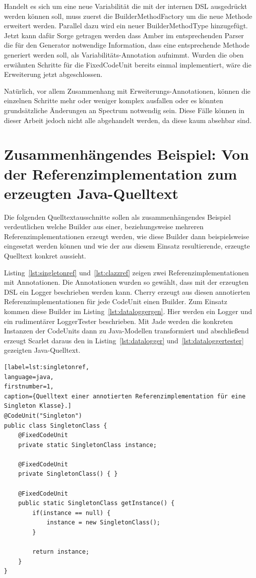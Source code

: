 \documentclass[12pt,oneside,a4paper,parskip]{scrbook}
\begin{document}
Handelt es sich um eine neue Variabilität die mit der internen DSL ausgedrückt werden können soll, muss zuerst die BuilderMethodFactory um die neue Methode erweitert werden. Parallel dazu wird ein neuer BuilderMethodType hinzugefügt. Jetzt kann dafür Sorge getragen werden dass Amber im entsprechenden Parser die für den Generator notwendige Information, dass eine entsprechende Methode generiert werden soll, als Variabilitäts-Annotation aufnimmt. Wurden die oben erwähnten Schritte für die FixedCodeUnit bereits einmal implementiert, wäre die Erweiterung jetzt abgeschlossen.

Natürlich, vor allem Zusammenhang mit Erweiterungs-Annotationen, können die einzelnen Schritte mehr oder weniger komplex ausfallen oder es könnten grundsätzliche Änderungen an Spectrum notwendig sein. Diese Fälle können in dieser Arbeit jedoch nicht alle abgehandelt werden, da diese kaum absehbar sind.

\section{Zusammenhängendes Beispiel: Von der Referenzimplementation zum erzeugten Java-Quelltext}

Die folgenden Quelltextausschnitte sollen als zusammenhängendes Beispiel verdeutlichen welche Builder aus einer, beziehungsweise mehreren Referenzimplementationen erzeugt werden, wie diese Builder dann beispielsweise eingesetzt werden können und wie der aus diesem Einsatz resultierende, erzeugte Quelltext konkret aussieht.

Listing~\ref{lst:singletonref} und~\ref{lst:clazzref} zeigen zwei Referenzimplementationen mit Annotationen. Die Annotationen wurden so gewählt, dass mit der erzeugten DSL ein Logger beschrieben werden kann. Cherry erzeugt aus diesen annotierten Referenzimplementationen für jede CodeUnit einen Builder. Zum Einsatz kommen diese Builder im Listing~\ref{lst:dataloggergen}. Hier werden ein Logger und ein rudimentärer LoggerTester beschrieben. Mit Jade werden die konkreten Instanzen der CodeUnits dann zu Java-Modellen transformiert und abschließend erzeugt Scarlet daraus den in Listing~\ref{lst:datalogger} und~\ref{lst:dataloggertester} gezeigten Java-Quelltext.

\begin{lstlisting}[label=lst:singletonref,
language=java,
firstnumber=1,
caption={Quelltext einer annotierten Referenzimplementation für eine Singleton Klasse}.]
@CodeUnit("Singleton")
public class SingletonClass {
	@FixedCodeUnit
	private static SingletonClass instance;
	
	@FixedCodeUnit
	private SingletonClass() { }
	
	@FixedCodeUnit
	public static SingletonClass getInstance() {
		if(instance == null) {
			instance = new SingletonClass();
		}
		
		return instance;
	}
}
\end{lstlisting}
\end{document}
